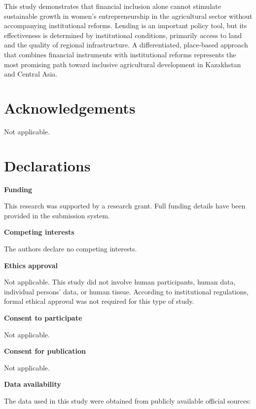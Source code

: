 ﻿\documentclass[pdflatex,sn-mathphys-ay]{sn-jnl}
\begin{document}
This study demonstrates that financial inclusion alone cannot stimulate
sustainable growth in women's entrepreneurship in the agricultural
sector without accompanying institutional reforms. Lending is an
important policy tool, but its effectiveness is determined by
institutional conditions, primarily access to land and the quality of
regional infrastructure. A differentiated, place-based approach that
combines financial instruments with institutional reforms represents the
most promising path toward inclusive agricultural development in
Kazakhstan and Central Asia.

\backmatter

\section*{Acknowledgements}

Not applicable.

\section*{Declarations}

\medskip
\noindent\textbf{Funding}

This research was supported by a research grant. Full funding details
have been provided in the submission system.

\medskip
\noindent\textbf{Competing interests}

The authors declare no competing interests.

\medskip
\noindent\textbf{Ethics approval}

Not applicable. This study did not involve human participants, human
data, individual persons' data, or human tissue. According to
institutional regulations, formal ethical approval was not required for
this type of study.

\medskip
\noindent\textbf{Consent to participate}

Not applicable.

\medskip
\noindent\textbf{Consent for publication}

Not applicable.

\medskip
\noindent\textbf{Data availability}

The data used in this study were obtained from publicly available
official sources:
\end{document}
